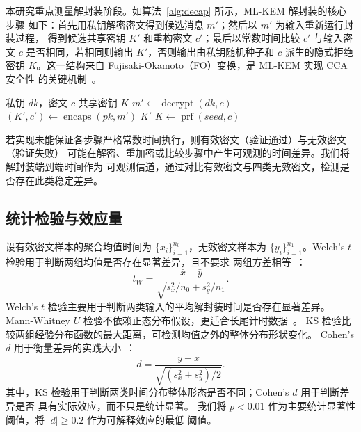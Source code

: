 \documentclass[a4paper,fontset=none]{ctexart}
\begin{document}
本研究重点测量解封装阶段。如算法~\ref{alg:decap} 所示，ML-KEM 解封装的核心步骤
如下：首先用私钥解密密文得到候选消息 $m'$；然后以 $m'$ 为输入重新运行封装过程，
得到候选共享密钥 $K'$ 和重构密文 $c'$；最后以常数时间比较 $c'$ 与输入密文 $c$
是否相同，若相同则输出 $K'$，否则输出由私钥随机种子和 $c$ 派生的隐式拒绝密钥
$\bar{K}$。这一结构来自 Fujisaki-Okamoto（FO）变换，是 ML-KEM 实现 CCA 安全性
的关键机制~\cite{Kyber2021}。

\begin{algorithm}[H]
\caption{ML-KEM 解封装核心流程（简化）}
\label{alg:decap}
\begin{algorithmic}[1]
\Require 私钥 $\mathit{dk}$，密文 $c$
\Ensure 共享密钥 $K$
\State $m' \leftarrow \operatorname{decrypt}(\mathit{dk}, c)$ 
\State $(K', c') \leftarrow \operatorname{encaps}(\mathit{pk}, m')$ 
 
  \State \Return $K'$ 
\Else
  \State \Return $\bar{K} \leftarrow \operatorname{prf}(\mathit{seed}, c)$ 
\EndIf
\end{algorithmic}
\end{algorithm}

若实现未能保证各步骤严格常数时间执行，则有效密文（验证通过）与无效密文（验证失败）
可能在解密、重加密或比较步骤中产生可观测的时间差异。我们将解封装端到端时间作为
可观测信道，通过对比有效密文与四类无效密文，检测是否存在此类稳定差异。

\subsection{统计检验与效应量}

设有效密文样本的聚合均值时间为 $\{x_i\}_{i=1}^{n_0}$，无效密文样本为
$\{y_i\}_{i=1}^{n_1}$。Welch's $t$ 检验用于判断两组均值是否存在显著差异，且不要求
两组方差相等~\cite{Welch1947}：
\begin{equation}
  t_W=\frac{\bar{x}-\bar{y}}
  {\sqrt{s_x^2/n_0+s_y^2/n_1}} .
  \label{eq:welch}
\end{equation}
Welch's $t$ 检验主要用于判断两类输入的平均解封装时间是否存在显著差异。
Mann-Whitney $U$ 检验不依赖正态分布假设，更适合长尾计时数据~\cite{Mann1947}。
KS 检验比较两组经验分布函数的最大距离，可检测均值之外的整体分布形状变化。
Cohen's $d$ 用于衡量差异的实践大小~\cite{Cohen1988}：
\begin{equation}
  d=\frac{\bar{y}-\bar{x}}
  {\sqrt{(s_x^2+s_y^2)/2}} .
  \label{eq:cohen}
\end{equation}
其中，KS 检验用于判断两类时间分布整体形态是否不同；Cohen's $d$ 用于判断差异是否
具有实际效应，而不只是统计显著。
我们将 $p<0.01$ 作为主要统计显著性阈值，将 $|d|\ge 0.2$ 作为可解释效应的最低
阈值。
\end{document}
